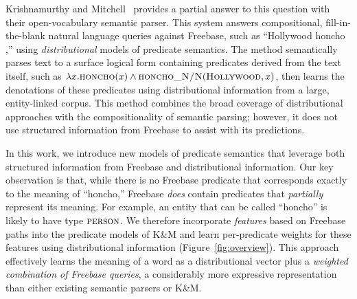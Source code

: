 \documentclass[11pt]{article}
\newcommand{\figref}[1]{Figure~\ref{fig:#1}}
\newcommand{\blank}{\underline{\hspace{.5cm}}}
\newcommand{\predicate}[1]{\ensuremath{\textsc{#1}}}
\newcommand{\entity}[1]{\ensuremath{\textsc{#1}}}
\begin{document}

Krishnamurthy and
Mitchell~
provides a partial answer to this question with their open-vocabulary
semantic parser. This system answers compositional, fill-in-the-blank
natural language queries against Freebase, such as ``Hollywood honcho
\blank{},'' using \emph{distributional} models of predicate
semantics. The method semantically parses text to a surface logical
form containing predicates derived from the text itself, such as
$\lambda x.\predicate{honcho}(x) \land
\predicate{honcho\_N/N}(\entity{Hollywood}, x)$, then learns the
denotations of these predicates using distributional information from
a large, entity-linked corpus. This method combines the broad coverage
of distributional approaches with the compositionality of semantic
parsing; however, it does not use structured information from Freebase
to assist with its predictions.

In this work, we introduce new models of predicate semantics that
leverage both structured information from Freebase and distributional
information. Our key observation is that, while there is no Freebase
predicate that corresponds exactly to the meaning of ``honcho,''
Freebase \emph{does} contain predicates that \emph{partially}
represent its meaning. For example, an entity that can be called
``honcho'' is likely to have type \predicate{person}. We therefore
incorporate \emph{features} based on Freebase paths into the predicate
models of K\&M and learn per-predicate weights for these features
using distributional information (\figref{overview}). This approach
effectively learns the meaning of a word as a distributional vector
plus a \emph{weighted combination of Freebase queries}, a considerably
more expressive representation than either existing semantic parsers
or K\&M.
\end{document}
